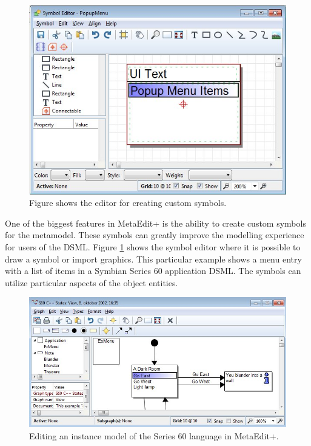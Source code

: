 \begin{figure}[hp]
  \centering
  \centerline{\includegraphics[scale=0.8]{images/me_symbol_editor.jpeg}}
  \caption[MetaEdit+ symbol editor]{Figure shows the editor for creating custom symbols.}
  \label{fig:metacase_symbol}
\end{figure}

One of the biggest features in MetaEdit+ is the ability to create custom symbols for the metamodel. These symbols can greatly improve the modelling experience for users of the DSML. Figure \ref{fig:metacase_symbol} shows the symbol editor where it is possible to draw a symbol or import graphics. This particular example shows a menu entry with a list of items in a Symbian Series 60 application DSML. The symbols can utilize particular aspects of the object entities.

\begin{figure}[hp]
  \centering
  \centerline{\includegraphics[scale=0.6]{images/me_instance_model_editor.jpeg}}
  \caption[MetaEdit+ instance model editor]{Editing an instance model of the Series 60 language in MetaEdit+.}
  \label{fig:metacase_metamodel}
\end{figure}

